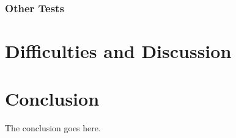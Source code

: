 \documentclass[10pt,twocolumn,letterpaper]{article}
\begin{document}
\subsubsection*{Other Tests}

\section{Difficulties and Discussion}
\label{sec:difficulties}

\section{Conclusion}
\label{sec:concl}
The conclusion goes here.










\end{document}
